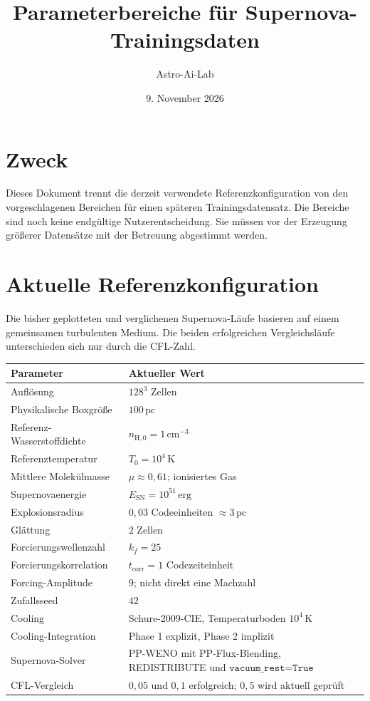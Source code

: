 \documentclass[11pt,a4paper]{article}
\title{Parameterbereiche für Supernova-Trainingsdaten}
\author{Astro-Ai-Lab}
\date{9. November 2026}
\begin{document}
\maketitle

\section*{Zweck}

Dieses Dokument trennt die derzeit verwendete Referenzkonfiguration von den
vorgeschlagenen Bereichen für einen späteren Trainingsdatensatz. Die Bereiche
sind noch keine endgültige Nutzerentscheidung. Sie müssen vor der Erzeugung
größerer Datensätze mit der Betreuung abgestimmt werden.

\section{Aktuelle Referenzkonfiguration}

Die bisher geplotteten und verglichenen Supernova-Läufe basieren auf einem
gemeinsamen turbulenten Medium. Die beiden erfolgreichen Vergleichsläufe
unterschieden sich nur durch die CFL-Zahl.

\begin{tabularx}{\textwidth}{p{4.1cm}Y}
\toprule
Parameter & Aktueller Wert \\
\midrule
Auflösung & $128^3$ Zellen \\
Physikalische Boxgröße & $100\,\mathrm{pc}$ \\
Referenz-Wasserstoffdichte & $n_{\mathrm H,0}=1\,\mathrm{cm}^{-3}$ \\
Referenztemperatur & $T_0=10^4\,\mathrm K$ \\
Mittlere Molekülmasse & $\mu\approx0{,}61$; ionisiertes Gas \\
Supernovaenergie & $E_{\mathrm{SN}}=10^{51}\,\mathrm{erg}$ \\
Explosionsradius & $0{,}03$ Codeeinheiten $\approx3\,\mathrm{pc}$ \\
Glättung & $2$ Zellen \\
Forcierungswellenzahl & $k_f=25$ \\
Forcierungskorrelation & $t_{\mathrm{corr}}=1$ Codezeiteinheit \\
Forcing-Amplitude & $9$; nicht direkt eine Machzahl \\
Zufallsseed & $42$ \\
Cooling & Schure-2009-CIE, Temperaturboden $10^4\,\mathrm K$ \\
Cooling-Integration & Phase 1 explizit, Phase 2 implizit \\
Supernova-Solver & PP-WENO mit PP-Flux-Blending, REDISTRIBUTE und $\texttt{vacuum\_rest=True}$ \\
CFL-Vergleich & $0{,}05$ und $0{,}1$ erfolgreich; $0{,}5$ wird aktuell geprüft \\
\bottomrule
\end{tabularx}
\end{document}
